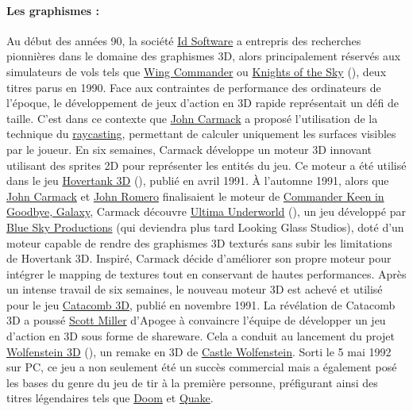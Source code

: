 \documentclass[12pt]{report}
\begin{document}
\paragraph{Les graphismes :}
Au début des années 90, la société \href{https://fr.wikipedia.org/wiki/Id_Software}{Id Software} a entrepris des 
recherches pionnières dans le domaine des graphismes 3D, alors principalement réservés aux simulateurs de vols tels 
que \href{https://fr.wikipedia.org/wiki/Wing_Commander_(jeu_vid%C3%A9o)}{Wing Commander} ou 
\href{https://en.wikipedia.org/wiki/Knights_of_the_Sky}{Knights of the Sky} (), deux titres parus en 1990. Face aux 
contraintes de performance des ordinateurs de l'époque, le développement de jeux d'action en 3D rapide représentait 
un défi de taille. C'est dans ce contexte que \href{https://fr.wikipedia.org/wiki/John_Carmack}{John Carmack} a 
proposé l'utilisation de la technique du \href{https://fr.wikipedia.org/wiki/Raycasting}{raycasting}, permettant 
de calculer uniquement les surfaces visibles par le joueur. En six semaines, Carmack développe un moteur 3D innovant 
utilisant des sprites 2D pour représenter les entités du jeu. Ce moteur a été utilisé dans le jeu 
\href{https://fr.wikipedia.org/wiki/Hovertank_3D}{Hovertank 3D} (), publié en avril 1991.
À l'automne 1991, alors que \href{https://fr.wikipedia.org/wiki/John_Carmack}{John Carmack} et 
\href{https://fr.wikipedia.org/wiki/John_Romero}{John Romero} finalisaient le moteur de 
\href{https://en.wikipedia.org/wiki/Commander_Keen_in_Goodbye,_Galaxy}{Commander Keen in Goodbye, Galaxy}, Carmack 
découvre \href{https://fr.wikipedia.org/wiki/Ultima_Underworld}{Ultima Underworld} (), un jeu développé par 
\href{https://fr.wikipedia.org/wiki/Looking_Glass_Studios}{Blue Sky Productions} (qui deviendra plus tard Looking Glass Studios), 
doté d'un moteur capable de rendre des graphismes 3D texturés sans subir les limitations de Hovertank 3D.
Inspiré, Carmack décide d'améliorer son propre moteur pour 
intégrer le mapping de textures tout en conservant de hautes performances. Après un intense travail de six semaines, 
le nouveau moteur 3D est achevé et utilisé pour le jeu \href{https://fr.wikipedia.org/wiki/Catacomb_3D}{Catacomb 3D},
publié en novembre 1991. La révélation de Catacomb 3D a poussé 
\href{https://fr.wikipedia.org/wiki/Scott_Miller_(programmeur)}{Scott Miller} d'Apogee à convaincre l'équipe de 
développer un jeu d'action en 3D sous forme de shareware. Cela a conduit au lancement du projet 
\href{https://fr.wikipedia.org/wiki/Wolfenstein_3D}{Wolfenstein 3D} (), un remake en 3D de 
\href{https://fr.wikipedia.org/wiki/Castle_Wolfenstein}{Castle Wolfenstein}. Sorti le 5 mai 1992 sur PC, ce jeu a 
non seulement été un succès commercial mais a également posé les bases du genre du jeu de tir à la première personne, 
préfigurant ainsi des titres légendaires tels que 
\href{https://fr.wikipedia.org/wiki/Doom_(jeu_vid%C3%A9o,_1993)}{Doom} et 
\href{https://fr.wikipedia.org/wiki/Quake}{Quake}.
\end{document}
